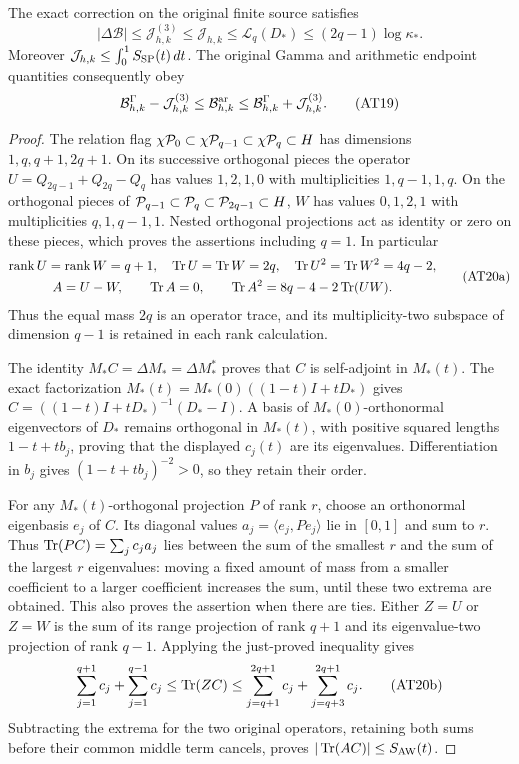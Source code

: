 \begin{theorem}
The exact correction on the original finite source satisfies
\[
 \boxed{|\Delta\mathcal B|\le\mathcal J_{h,k}^{(3)}\le\mathcal J_{h,k}
       \le\mathcal L_q(D_*)\le(2q-1)\log\kappa_*.}
 \tag{AT18}
\]
Moreover $\mathcal J_{h,k}\le\int_0^1S_{\rm SP}(t)\,dt$. The
original Gamma and arithmetic endpoint quantities consequently obey
\[
 \mathcal B^\Gamma_{h,k}-\mathcal J_{h,k}^{(3)}
 \le\mathcal B^{\mathrm{ar}}_{h,k}
 \le\mathcal B^\Gamma_{h,k}+\mathcal J_{h,k}^{(3)}.
 \tag{AT19}
\]
\end{theorem}
\begin{proof}
The relation flag
$\chi\mathcal P_0\subset\chi\mathcal P_{q-1}\subset\chi\mathcal P_q\subset H$
has dimensions $1,q,q+1,2q+1$. On its successive orthogonal
pieces the operator $U=Q_{2q-1}+Q_{2q}-Q_q$ has values
$1,2,1,0$ with multiplicities $1,q-1,1,q$.
On the orthogonal pieces of
$\mathcal P_{q-1}\subset\mathcal P_q\subset\mathcal P_{2q-1}\subset H$,
$W$ has values $0,1,2,1$ with multiplicities $q,1,q-1,1$.
Nested orthogonal projections act as identity or zero on these
pieces, which proves the assertions including $q=1$. In particular
\[
 \begin{gathered}
 \operatorname{rank}U=\operatorname{rank}W=q+1,\quad
 \operatorname{Tr} U=\operatorname{Tr} W=2q,\quad \operatorname{Tr} U^2=\operatorname{Tr} W^2=4q-2,\\
 A=U-W,\qquad \operatorname{Tr} A=0,\qquad
 \operatorname{Tr} A^2=8q-4-2\operatorname{Tr}(UW).
 \end{gathered}
 \tag{AT20a}
\]
Thus the equal mass $2q$ is an operator trace, and its multiplicity-two
subspace of dimension $q-1$ is retained in each rank calculation.

The identity $M_*C=\Delta M_*=\Delta M_*^*$ proves that $C$ is
self-adjoint in $M_*(t)$. The exact factorization
$M_*(t)=M_*(0)((1-t)I+tD_*)$ gives
$C=((1-t)I+tD_*)^{-1}(D_*-I)$. A basis of $M_*(0)$-orthonormal
eigenvectors of $D_*$ remains orthogonal in $M_*(t)$, with positive
squared lengths $1-t+tb_j$, proving that the displayed $c_j(t)$
are its eigenvalues. Differentiation in $b_j$ gives
$(1-t+tb_j)^{-2}>0$, so they retain their order.

For any $M_*(t)$-orthogonal projection $P$ of rank $r$, choose an
orthonormal eigenbasis $e_j$ of $C$. Its diagonal values
$a_j=\langle e_j,Pe_j\rangle$ lie in $[0,1]$ and sum to $r$.
Thus $\operatorname{Tr}(PC)=\sum_jc_ja_j$ lies between the sum of the smallest
$r$ and the sum of the largest $r$ eigenvalues: moving a fixed
amount of mass from a smaller coefficient to a larger coefficient
increases the sum, until these two extrema are obtained. This also
proves the assertion when there are ties. Either $Z=U$ or $Z=W$
is the sum of its range projection of rank $q+1$ and its
eigenvalue-two projection of rank $q-1$. Applying the just-proved
inequality gives
\[
 \sum_{j=1}^{q+1}c_j+\sum_{j=1}^{q-1}c_j
 \le\operatorname{Tr}(ZC)\le
 \sum_{j=q+1}^{2q+1}c_j+\sum_{j=q+3}^{2q+1}c_j.
 \tag{AT20b}
\]
Subtracting the extrema for the two original operators, retaining
both sums before their common middle term cancels, proves
$|\operatorname{Tr}(AC)|\le S_{\rm AW}(t)$.


\end{proof}
